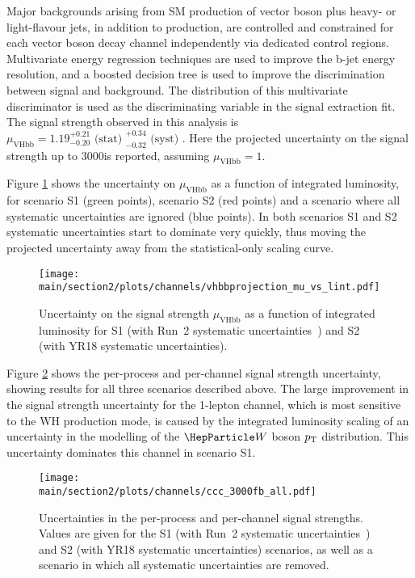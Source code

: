 Major backgrounds arising from SM production of vector boson plus heavy- or light-flavour jets, in addition to \ttbar production, are 
controlled and constrained for each vector boson decay channel independently via dedicated control regions. Multivariate energy
regression techniques are used to improve the b-jet energy resolution, and a boosted decision tree is used to improve the discrimination 
between signal and background. The distribution of this multivariate discriminator is used as the discriminating
variable in the signal extraction fit. 
The signal strength observed in this analysis is 
$\mu_{\text{VHbb}} = 1.19^{+0.21}_{-0.20}\text{ (stat) }^{+0.34}_{-0.32}\text{ (syst) }$. Here the projected uncertainty
on the signal strength up to 3000\fbinv is reported, assuming $\mu_{\text{VHbb}} = 1$.

Figure \ref{fig:vhbb_projection_intlumi} shows the uncertainty on $\mu_{\text{VHbb}}$ as a function
of integrated luminosity, for scenario S1 (green points), scenario S2 (red points) and a scenario
where all systematic uncertainties are ignored (blue points).
In both scenarios
S1 and S2 systematic uncertainties start to dominate very quickly, thus moving the projected 
uncertainty away from the statistical-only scaling curve.

\begin{figure}[h!]
\begin{center}
\texttt{[image: \\main/section2/plots/channels/vhbbprojection\_mu\_vs\_lint.pdf]}
\end{center}
\caption{Uncertainty on the signal strength $\mu_{\text{VHbb}}$ as a function of integrated luminosity for S1 (with Run~2 systematic uncertainties~\cite{HIG16044}) and S2 (with YR18 systematic uncertainties).}
\label{fig:vhbb_projection_intlumi}
\end{figure}

Figure \ref{fig:vhbb_proj_bars} shows the per-process and
per-channel signal strength uncertainty, showing results for all three scenarios described above.
The large improvement in the signal strength uncertainty for the 1-lepton channel, which is most sensitive to the WH production
mode, is caused by the integrated luminosity scaling of an uncertainty in the modelling of the $\PW$ boson $p\sb{\scriptstyle\mathrm{T}}$ distribution. This uncertainty dominates this channel
in scenario S1.

\begin{figure}[h!]
\begin{center}
\texttt{[image: \\main/section2/plots/channels/ccc\_3000fb\_all.pdf]}
\end{center}
\caption{Uncertainties in the per-process and per-channel signal strengths. Values are given for the S1 (with Run~2 systematic uncertainties~\cite{HIG16044}) and S2 (with YR18 systematic uncertainties) scenarios, as well as a scenario in which all systematic uncertainties are removed.}
\label{fig:vhbb_proj_bars}
\end{figure}

